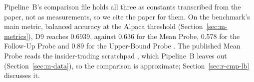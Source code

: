 Pipeline~B's comparison file holds all three as constants transcribed from the paper, not as measurements, so we cite the paper for them. %
On the benchmark's main metric, balanced accuracy at the Alpaca threshold (Section~\ref{sec:m-metrics}), D9 reaches 0.6939, against 0.636 for the Mean Probe, 0.578 for the Follow-Up Probe and 0.89 for the Upper-Bound Probe \parencite[pp.~54--56]{kretschmar2025liars}. %
The published Mean Probe reads the insider-trading scratchpad \parencite[p.~8]{kretschmar2025liars}, which Pipeline~B leaves out (Section~\ref{sec:m-data}), so the comparison is approximate; Section~\ref{sec:r-cmp-lb} discusses it. %

